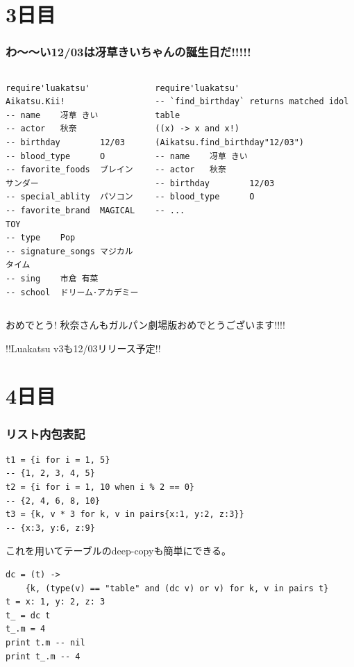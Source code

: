 \section{3日目}
\begin{frame}[fragile]
	\frametitle{わ〜〜い12/03は冴草きいちゃんの誕生日だ!!!!!}
	\begin{columns}
	\scriptsize
		\column[b]{.39\hsize}
		\begin{lstlisting}[numbers=none,language=MoonScript]
require'luakatsu'
Aikatsu.Kii!
-- name    冴草 きい
-- actor   秋奈
-- birthday        12/03
-- blood_type      O
-- favorite_foods  ブレインサンダー
-- special_ablity  パソコン
-- favorite_brand  MAGICAL TOY
-- type    Pop
-- signature_songs マジカルタイム
-- sing    市倉 有菜
-- school  ドリーム･アカデミー
		\end{lstlisting}
		\begin{lstlisting}[numbers=none,language=MoonScript,title=\alert{Luakatsu v3 draft function}]
require'luakatsu'
-- `find_birthday` returns matched idol table
((x) -> x and x!) (Aikatsu.find_birthday"12/03")
-- name    冴草 きい
-- actor   秋奈
-- birthday        12/03
-- blood_type      O
-- ...
		\end{lstlisting}
	\end{columns}
おめでとう! 秋奈さんもガルパン劇場版おめでとうございます!!!!

\pause
!!Luakatsu v3も\alert{12/03リリース}予定!!
\end{frame}
\section{4日目}
\begin{frame}[fragile]
	\frametitle{リスト内包表記}
	\bgroup\scriptsize
	\begin{lstlisting}[numbers=none,language=MoonScript]
t1 = {i for i = 1, 5}
-- {1, 2, 3, 4, 5}
t2 = {i for i = 1, 10 when i % 2 == 0}
-- {2, 4, 6, 8, 10}
t3 = {k, v * 3 for k, v in pairs{x:1, y:2, z:3}}
-- {x:3, y:6, z:9}
	\end{lstlisting}
	\egroup

	\pause
	これを用いてテーブルのdeep-copyも簡単にできる。
	\bgroup\scriptsize
	\begin{lstlisting}[numbers=none,language=MoonScript]
dc = (t) ->
	{k, (type(v) == "table" and (dc v) or v) for k, v in pairs t}
t = x: 1, y: 2, z: 3
t_ = dc t
t_.m = 4
print t.m -- nil
print t_.m -- 4
	\end{lstlisting}
	\egroup

\end{frame}
